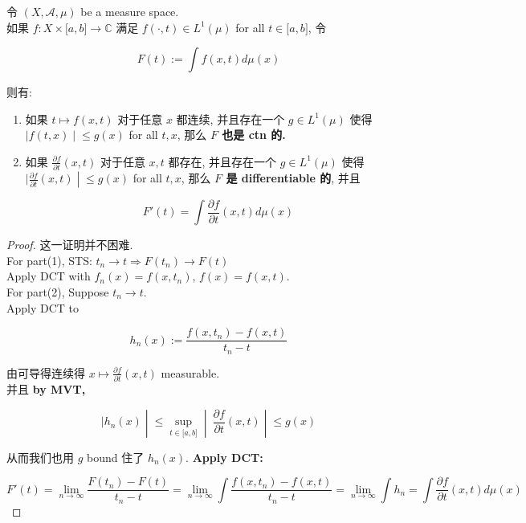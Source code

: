 \documentclass{qlnotes-export}
\begin{document}
\begin{corollary}\label{cor-05-integration-of-real-and-complex-functions-corollary-002}

令 \((X,\mathcal{A},\mu)\) be a measure space.\\
如果 \(f:X \times \lbrack a,b\rbrack\rightarrow{\mathbb{C}}\) 满足 \(f( \cdot ,t) \in L^{1}(\mu)\) for all \(t \in \lbrack a,b\rbrack\), 令

\[F(t) := \int f(x,t) d\mu(x)\]

则有:

\begin{enumerate}
\item
  如果 \(t\mapsto f(x,t)\) 对于任意 \(x\) 都连续, 并且存在一个 \(g \in L^{1}(\mu)\) 使得 \(\left. |f(t,x) \middle| \leq g(x) \right.\) for all \(t,x\), 那么 \textbf{\(F\) 也是 ctn 的.}
\item
  如果 \(\frac{\partial f}{\partial t}(x,t)\) 对于任意 \(x,t\) 都存在, 并且存在一个 \(g \in L^{1}(\mu)\) 使得 \(\left. |\frac{\partial f}{\partial t}(x,t) \middle| \leq g(x) \right.\) for all \(t,x\), 那么 \textbf{\(F\) 是 differentiable 的}, 并且

  \[F'(t) = \int\frac{\partial f}{\partial t}(x,t) d\mu(x)\]
\end{enumerate}

\end{corollary}

\begin{proof}

这一证明并不困难.\\
For part(1), STS: \(t_{n}\rightarrow t\Longrightarrow F(t_{n})\rightarrow F(t)\)\\
Apply DCT with \(f_{n}(x) = f(x,t_{n})\), \(f(x) = f(x,t)\).\\
For part(2), Suppose \(t_{n}\rightarrow t\).\\
Apply DCT to

\[h_{n}(x) := \frac{f(x,t_{n}) - f(x,t)}{t_{n} - t}\]

由可导得连续得 \(x\mapsto\frac{\partial f}{\partial t}(x,t)\) measurable.\\
并且 \textbf{by MVT,}

\[\left. |h_{n}(x) \middle| \leq \sup\limits_{t \in \lbrack a,b\rbrack} \middle| \ \frac{\partial f}{\partial t}(x,t) \middle| \leq g(x) \right.\]

从而我们也用 \(g\) bound 住了 \(h_{n}(x)\). \textbf{Apply DCT:}

\[F'(t) = \lim\limits_{n\rightarrow\infty}\frac{F(t_{n}) - F(t)}{t_{n} - t} = \lim\limits_{n\rightarrow\infty}\int\frac{f(x,t_{n}) - f(x,t)}{t_{n} - t} = \lim\limits_{n\rightarrow\infty}\int h_{n} = \int\frac{\partial f}{\partial t}(x,t) d\mu(x)\]

\end{proof}
\end{document}
